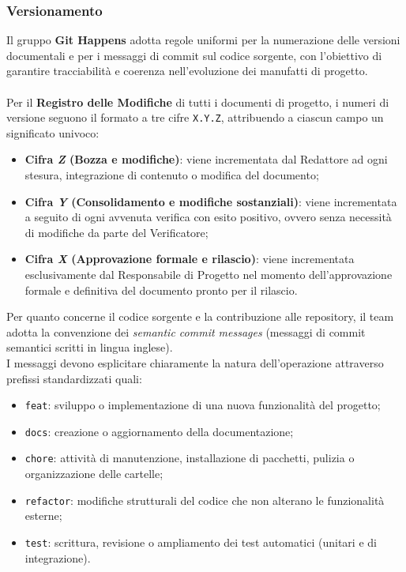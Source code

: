 \subsubsection{Versionamento}
Il gruppo \textbf{Git Happens} adotta regole uniformi per la numerazione delle versioni documentali e per i messaggi di commit sul codice sorgente, con l'obiettivo di garantire tracciabilità e coerenza nell'evoluzione dei manufatti di progetto. \\
\\
Per il \textbf{Registro delle Modifiche} di tutti i documenti di progetto, i numeri di versione seguono il formato a tre cifre \texttt{X.Y.Z}, attribuendo a ciascun campo un significato univoco:
\begin{itemize}
    \item \textbf{Cifra \textit{Z} (Bozza e modifiche)}: viene incrementata dal Redattore ad ogni stesura, integrazione di contenuto o modifica del documento;
    \item \textbf{Cifra \textit{Y} (Consolidamento e modifiche sostanziali)}: viene incrementata a seguito di ogni avvenuta verifica con esito positivo, ovvero senza necessità di modifiche da parte del Verificatore;
    \item \textbf{Cifra \textit{X} (Approvazione formale e rilascio)}: viene incrementata esclusivamente dal Responsabile di Progetto nel momento dell'approvazione formale e definitiva del documento pronto per il rilascio.
\end{itemize}

\noindent Per quanto concerne il codice sorgente e la contribuzione alle repository, il team adotta la convenzione dei \emph{semantic commit messages} (messaggi di commit semantici scritti in lingua inglese). \\
I messaggi devono esplicitare chiaramente la natura dell'operazione attraverso prefissi standardizzati quali:
\begin{itemize}
    \item \texttt{feat}: sviluppo o implementazione di una nuova funzionalità del progetto;
    \item \texttt{docs}: creazione o aggiornamento della documentazione;
    \item \texttt{chore}: attività di manutenzione, installazione di pacchetti, pulizia o organizzazione delle cartelle;
    \item \texttt{refactor}: modifiche strutturali del codice che non alterano le funzionalità esterne;
    \item \texttt{test}: scrittura, revisione o ampliamento dei test automatici (unitari e di integrazione).
\end{itemize}

